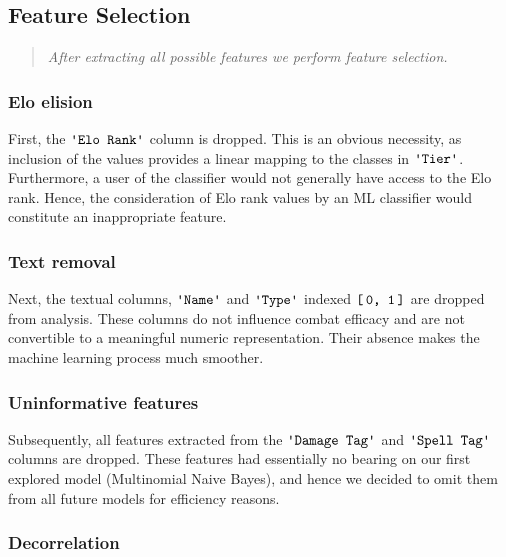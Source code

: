 \documentclass{article}
\newcommand{\Column}[1]{\ensuremath{\texttt{\textquotesingle{}#1\textquotesingle{}}}\xspace}
\newcommand{\IndexRange}[2]{\ensuremath{\texttt{{[}\,#1,\ #2\,{]}}}\xspace}
\begin{document}
\hypertarget{feature-selection}{%
\subsection{Feature Selection}\label{feature-selection}}

\begin{quote}
	{\itshape After extracting all possible features we perform feature selection.}
\end{quote}


\hypertarget{text-removal}{
\subsubsection{Elo elision}\label{elo-elision}}

First, the \Column{Elo Rank} column is dropped.
This is an obvious necessity, as inclusion of the values provides a linear mapping to the classes in \Column{Tier}.
Furthermore, a user of the classifier would not generally have access to the Elo rank.
Hence, the consideration of Elo rank values by an ML classifier would constitute an inappropriate feature.


\hypertarget{text-removal}{
\subsubsection{Text removal}\label{text-removal}}

Next, the textual columns, \Column{Name} and \Column{Type} indexed \IndexRange{0}{1} are dropped from analysis.
These columns do not influence combat efficacy and are not convertible to a meaningful
numeric representation.
Their absence makes the machine learning process much smoother.


\hypertarget{uninformative-features}{
\subsubsection{Uninformative features}\label{uninformative-features}}

Subsequently,  all features extracted from the \Column{Damage Tag} and \Column{Spell Tag} columns are dropped.
These features had essentially no bearing on our first explored model (Multinomial Naive Bayes), and hence we decided to omit them from all future models for efficiency reasons.


\hypertarget{decorrelation}{
\subsubsection{Decorrelation}\label{decorrelation}}
\end{document}
